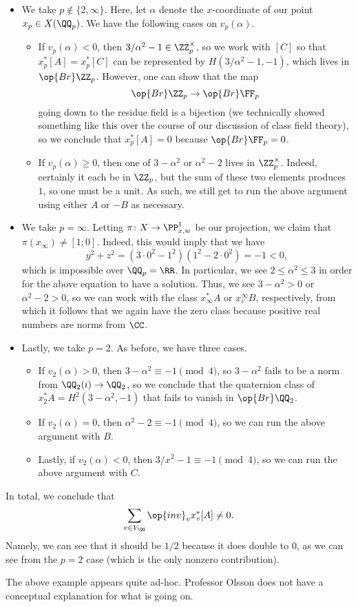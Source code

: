 \documentclass[../notes.tex]{subfiles}
\begin{document}
\begin{itemize}
	\item We take $p\notin\{2,\infty\}$. Here, let $\alpha$ denote the $x$-coordinate of our point $x_p\in X(\QQ_p)$. We have the following cases on $v_p(\alpha)$.
	\begin{itemize}
		\item If $v_p(\alpha)<0$, then $3/\alpha^2-1\in\ZZ_p^\times$, so we work with $[C]$ so that $x_p^*[A]=x_p^*[C]$ can be represented by $H\left(3/\alpha^2-1,-1\right)$, which lives in $\op{Br}\ZZ_p$. However, one can show that the map
		\[\op{Br}\ZZ_p\to\op{Br}\FF_p\]
		going down to the residue field is a bijection (we technically showed something like this over the course of our discussion of class field theory), so we conclude that $x_p^*[A]=0$ because $\op{Br}\FF_p=0$.
		\item If $v_p(\alpha)\ge0$, then one of $3-\alpha^2$ or $\alpha^2-2$ lives in $\ZZ_p^\times$. Indeed, certainly it each be in $\ZZ_p$, but the sum of these two elements produces $1$, so one must be a unit. As such, we still get to run the above argument using either $A$ or $-B$ as necessary.
	\end{itemize}
	\item We take $p=\infty$. Letting $\pi\colon X\to\PP^1_{x,w}$ be our projection, we claim that $\pi(x_\infty)\ne[1:0]$. Indeed, this would imply that we have
	\[y^2+z^2=\left(3\cdot0^2-1^2\right)\left(1^2-2\cdot0^2\right)=-1<0,\]
	which is impossible over $\QQ_p=\RR$. In particular, we see $2\le\alpha^2\le3$ in order for the above equation to have a solution. Thus, we see $3-\alpha^2>0$ or $\alpha^2-2>0$, so we can work with the class $x_\infty^*A$ or $x_v^\infty B$, respectively, from which it follows that we again have the zero class because positive real numbers are norms from $\CC$.
	\item Lastly, we take $p=2$. As before, we have three cases.
	\begin{itemize}
		\item If $v_2(\alpha)>0$, then $3-\alpha^2\equiv-1\pmod4$, so $3-\alpha^2$ fails to be a norm from $\QQ_2(i)\to\QQ_2$, so we conclude that the quaternion class of $x_2^*A=H^2\left(3-\alpha^2,-1\right)$ that fails to vanish in $\op{Br}\QQ_2$.
		\item If $v_2(\alpha)=0$, then $\alpha^2-2\equiv-1\pmod4$, so we can run the above argument with $B$.
		\item Lastly, if $v_2(\alpha)<0$, then $3/x^2-1\equiv-1\pmod4$, so we can run the above argument with $C$.
	\end{itemize}
\end{itemize}
In total, we conclude that
\[\sum_{v\in V_\QQ}\op{inv}_vx_v^*[A]\ne0.\]
Namely, we can see that it should be $1/2$ because it does double to $0$, as we can see from the $p=2$ case (which is the only nonzero contribution).
\begin{remark}
	The above example appears quite ad-hoc. Professor Olsson does not have a conceptual explanation for what is going on.
\end{remark}
\end{document}
